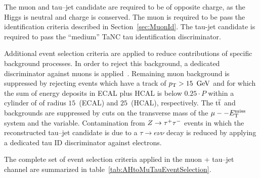 The muon and tau--jet candidate are required to be of opposite charge, as the
Higgs is neutral and charge is conserved.  The muon is required to be pass the
identification criteria described in Section~\ref{sec:MuonId}.   The tau-jet
candidate is required to pass the ``medium'' TaNC tau identification 
discriminator. 

Additional event selection criteria are applied to reduce contributions of
specific background processes. In order to reject this background, a dedicated
discriminator against muons is applied~\cite{CMS-PAS-PFT-08-001}. Remaining muon
background is suppressed by rejecting events which have a track of $p_{\mathrm{T}} >
15~\,\text{Ge\hspace{-.08em}V}$ and for which the sum of energy deposits in ECAL plus HCAL is below
$0.25 \cdot P$ within a cylinder of of radius $15$~\centi\meter (ECAL) and
$25$~\centi\meter (HCAL), respectively.  The $\mathrm{t}\overline{\mathrm{t}}$ and \WpJets backgrounds
are suppressed by cuts on the transverse mass of the $\mu--E_{\mathrm{T}}^{\text{miss}}$ system and the
\Pzeta variable.  Contamination from $Z \to \tau^+\tau^-$ events in which the
reconstructed tau--jet candidate is due to a $\tau \to e \nu \nu$ decay is
reduced by applying a dedicated tau ID discriminator against electrons.



The complete set of event selection criteria applied in the muon +
tau--jet channel are summarized in table~\ref{tab:AHtoMuTauEventSelection}.

